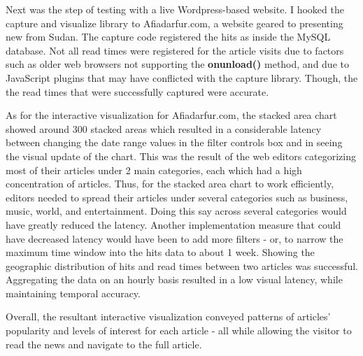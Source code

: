 \documentclass[12pt]{article}
\begin{document}
Next was the step of testing with a live Wordpress-based website. I hooked the capture and visualize library to Afiadarfur.com, a website geared to presenting new from Sudan. The capture code registered the hits as inside the MySQL database. Not all read times were registered for the article visits due to factors such as older web browsers not supporting the \textbf{onunload()} method, and due to JavaScript plugins that may have conflicted with the capture library. Though, the the read times that were successfully captured were accurate. 
 
As for the interactive visualization for Afiadarfur.com, the stacked area chart showed around 300 stacked areas which resulted in a considerable latency between changing the date range values in the filter controls box and in seeing the visual update of the chart. This was the result of the web editors categorizing most of their articles under 2 main categories, each which had a high concentration of articles. Thus, for the stacked area chart to work efficiently, editors needed to spread their articles under several categories such as business, music, world, and entertainment. Doing this say across several categories would have greatly reduced the latency. Another implementation measure that could have decreased latency would have been to add more filters - or, to narrow the maximum time window into the hits data to about 1 week. 
Showing the geographic distribution of hits and read times between two articles was successful. Aggregating the data on an hourly basis resulted in a low visual latency, while maintaining temporal accuracy. 

Overall, the resultant interactive visualization conveyed patterns of articles' popularity and levels of interest for each article - all while allowing the visitor to read the news and navigate to the full article.

\newpage
\end{document}
